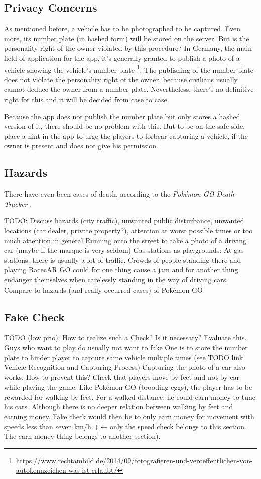\subsection{Privacy Concerns}
As mentioned before, a vehicle has to be photographed to be captured. Even more, its number plate (in hashed form) will be stored on the server. But is the personality right of the owner violated by this procedure? In Germany, the main field of application for the app, it's generally granted to publish a photo of a vehicle showing the vehicle's number plate \footnote{\url{https://www.rechtambild.de/2014/09/fotografieren-und-veroeffentlichen-von-autokennzeichen-was-ist-erlaubt/}}. The publishing of the number plate does not violate the personality right of the owner, because civilians usually cannot deduce the owner from a number plate. Nevertheless, there's no definitive right for this and it will be decided from case to case.

Because the app does not publish the number plate but only stores a hashed version of it, there should be no problem with this. But to be on the safe side, place a hint in the app to urge the players to forbear capturing a vehicle, if the owner is present and does not give his permission.

\subsection{Hazards}\label{sec:hazards}
There have even been cases of death, according to the \emph{Pok\'{e}mon GO Death Tracker} \citep{PokemonGoDeathTracker}.

TODO:
Discuss hazards (city traffic), unwanted public disturbance, unwanted locations (car dealer, private property?), attention at worst possible times or too much attention in general
Running onto the street to take a photo of a driving car (maybe if the marque is very seldom)
Gas stations as playgrounds: At gas stations, there is usually a lot of traffic. Crowds of people standing there and playing RacecAR GO could for one thing cause a jam and for another thing endanger themselves when carelessly standing in the way of driving cars.
Compare to hazards (and really occurred cases) of Pok\'{e}mon GO

\subsection{Fake Check}
TODO (low prio):
How to realize such a Check?
Is it necessary? Evaluate this. Guys who want to play do usually not want to fake
One is to store the number plate to hinder player to capture same vehicle multiple times (see TODO link Vehicle Recognition and Capturing Process)
Capturing the photo of a car also works. How to prevent this?
Check that players move by feet and not by car while playing the game: Like Pok\'{e}mon GO (brooding eggs), the player has to be rewarded for walking by feet. For a walked distance, he could earn money to tune his cars. Although there is no deeper relation between walking by feet and earning money. Fake check would then be to only earn money for movement with speeds less than seven km/h. ( ← only the speed check belongs to this section. The earn-money-thing belongs to another section).


